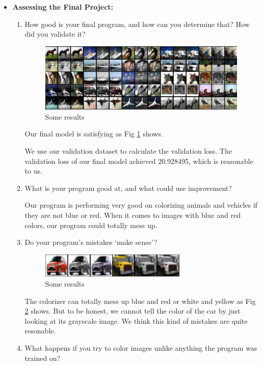 \documentclass[letter]{article}
\begin{document}
\begin{itemize}
	\item {\textbf{Assessing the Final Project:}} 
	\begin{enumerate}
		\item {How good is your final program, and how can you determine that? How
			did you validate it?}
		\begin{figure}[H]
			\centering
			\includegraphics[width=\textwidth]{figs/fig-5.png}
			\caption{Some results}
			\label{fig-5}
		\end{figure}
		\par{Our final model is satisfying as Fig \ref{fig-5} shows.}
		\par{We use our validation dataset to calculate the validation loss. The validation loss of our final model achieved 20.928495, which is reasonable to us. }
		\item {What is your program good at, and what could use improvement?}
		\par{Our program is performing very good on colorizing animals and vehicles if they are not blue or red. When it comes to images with blue and red colors, our program could totally mess up.}
		\item {Do your program's mistakes `make sense'?}
		\begin{figure}[H]
			\centering
			\includegraphics[width=0.7\textwidth]{figs/fig-3.png}
			\caption{Some results}
			\label{fig-3}
		\end{figure}
		\par{The colorizer can totally mess up blue and red or white and yellow as Fig \ref{fig-3} shows. But to be honest, we cannot tell the color of the car by just looking at its grayscale image. We think this kind of mistakes are quite resonable.}
		\item {What happens if you try to color images unlike anything the program was trained on?}
		\begin{figure}[H]

\end{figure}
\end{enumerate}
\end{itemize}
\end{document}
